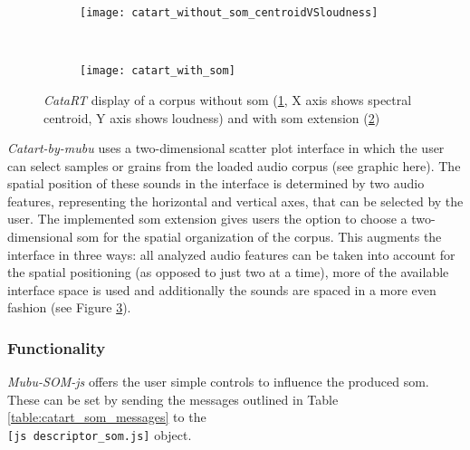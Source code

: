 \begin{figure}[!htb]
  \centering
\begin{subfigure}{0.45\textwidth}
  \centering
  \texttt{[image: catart\_without\_som\_centroidVSloudness]}
  \caption{}
  \label{fig:catart_no_som}
\end{subfigure}
~
\begin{subfigure}{0.45\textwidth}
  \centering
  \texttt{[image: catart\_with\_som]}
  \caption{}
  \label{fig:catart_with_som}
\end{subfigure}
\caption{\textit{CataRT} display of a corpus without \gls{som}
(\ref{fig:catart_no_som}, X axis shows spectral centroid, Y axis shows loudness)
and with \gls{som} extension (\ref{fig:catart_with_som})}
\label{fig:catart_som_vs_no_som}
\end{figure}


\textit{Catart-by-mubu} uses a
two-dimensional scatter plot interface in which the user can select samples or
grains from the loaded audio corpus (see
graphic here).
The spatial position of these sounds in the interface is determined by two audio
features, representing the horizontal and vertical axes, that can be selected by
the user.
The implemented \gls{som} extension gives users the option to choose a
two-dimensional \gls{som} for the spatial organization of the corpus. This
augments the interface in three ways: all analyzed audio features can be
taken into account for the spatial positioning (as opposed to just two at a
time), more of the available interface space is used and additionally the sounds
are spaced in a more even fashion (see Figure \ref{fig:catart_som_vs_no_som}).

\subsubsection{Functionality}
\label{subsubec:mubu-som_functionality}
\textit{Mubu-SOM-js} offers the user simple controls to influence the produced
\gls{som}. These can be set by sending the messages outlined in Table
\ref{table:catart_som_messages} to the \\ \texttt{[js descriptor\_som.js]}
object.

